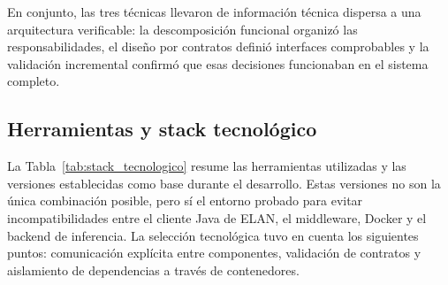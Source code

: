 En conjunto, las tres técnicas llevaron de información técnica dispersa a una arquitectura verificable: la descomposición funcional organizó las responsabilidades, el diseño por contratos definió interfaces comprobables y la validación incremental confirmó que esas decisiones funcionaban en el sistema completo.

\subsection{Herramientas y stack tecnológico}

La Tabla~\ref{tab:stack_tecnologico} resume las herramientas utilizadas y las versiones establecidas como base durante el desarrollo. Estas versiones no son la única combinación posible, pero sí el entorno probado para evitar incompatibilidades entre el cliente Java de ELAN, el middleware, Docker y el backend de inferencia. La selección tecnológica tuvo en cuenta los siguientes puntos: comunicación explícita entre componentes, validación de contratos y aislamiento de dependencias a través de contenedores.

